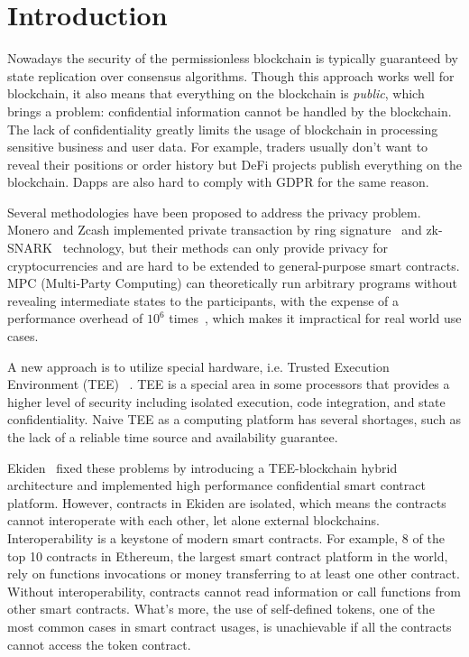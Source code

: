 \section{Introduction}

Nowadays the security of the permissionless blockchain is typically guaranteed by state replication over consensus algorithms. Though this approach works well for blockchain, it also means that everything on the blockchain is \textit{public}, which brings a problem: confidential information cannot be handled by the blockchain. The lack of confidentiality greatly limits the usage of blockchain in processing sensitive business and user data. For example, traders usually don't want to reveal their positions or order history but DeFi projects publish everything on the blockchain. Dapps are also hard to comply with GDPR for the same reason.

Several methodologies have been proposed to address the privacy problem. Monero and Zcash implemented private transaction by ring signature~\cite{van2013cryptonote} and zk-SNARK~\cite{sasson2014zerocash} technology, but their methods can only provide privacy for cryptocurrencies and are hard to be extended to general-purpose smart contracts. MPC (Multi-Party Computing) can theoretically run arbitrary programs without revealing intermediate states to the participants, with the expense of a performance overhead of $10^6$ times~\cite{cheng2019ekiden}, which makes it impractical for real world use cases.

A new approach is to utilize special hardware, i.e. Trusted Execution Environment (TEE)~\cite{teewiki} . TEE is a special area in some processors that provides a higher level of security including isolated execution, code integration, and state confidentiality. Naive TEE as a computing platform has several shortages, such as the lack of a reliable time source and availability guarantee.

Ekiden~\cite{cheng2019ekiden} fixed these problems by introducing a TEE-blockchain hybrid architecture and implemented high performance confidential smart contract platform. However, contracts in Ekiden are isolated, which means the contracts cannot interoperate with each other, let alone external blockchains. Interoperability is a keystone of modern smart contracts. For example, 8 of the top 10 contracts in Ethereum, the largest smart contract platform in the world, rely on functions invocations or money transferring to at least one other contract. Without interoperability, contracts cannot read information or call functions from other smart contracts. What's more, the use of self-defined tokens, one of the most common cases in smart contract usages, is unachievable if all the contracts cannot access the token contract.


